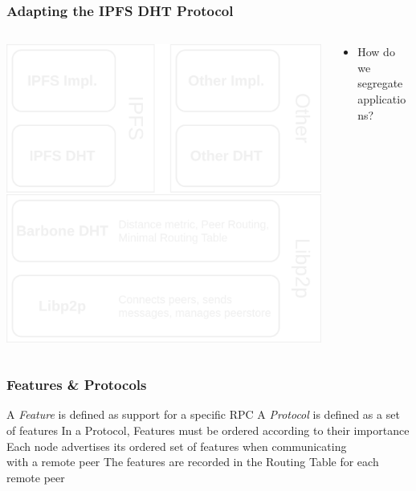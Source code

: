 \documentclass{../pl-slide}
\begin{document}
\begin{frame}
\frametitle{Adapting the IPFS DHT Protocol}
\begin{columns}
	\begin{column}{0.49\textwidth}
	\includegraphics[scale=.18]{resources/improved-dht-mult-stack-cat.png}
	\end{column}
		\begin{column}{0.49\textwidth}
        		\begin{itemize}
				\itemc IPFS content should be allocated to IPFS nodes only
				\itemc IPFS content should be looked up on IPFS nodes only
				\itemc Same for Other DHT's RPCs
				\itemc Peer Routing still works like before
				\bigskip
				\item[\greencube] How do we segregate applications?
        		\end{itemize}
	\end{column}

\end{columns}
\end{frame}

\begin{frame}
\frametitle{Features \& Protocols}
\begin{itemize}
	\itemc A \textit{Feature} is defined as support for a specific RPC
	\itemc A \textit{Protocol} is defined as a set of features
	\itemc In a Protocol, Features must be ordered according to their importance
	\itemc Each node advertises its ordered set of features when communicating\\with a remote peer
	\itemc The features are recorded in the Routing Table for each remote peer
\end{itemize}
\end{frame}
\end{document}
